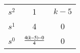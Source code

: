 \begin{center}
    \begin{tabular}{c|c c}
        $s^2$ & 1 & \(k-5\) \\
        $s^1$ & 4 & 0 \\
        $s^0$ & \(\frac{4\left(k-5\right)-0}{4}\) & 0 \\
    \end{tabular}
\end{center}


